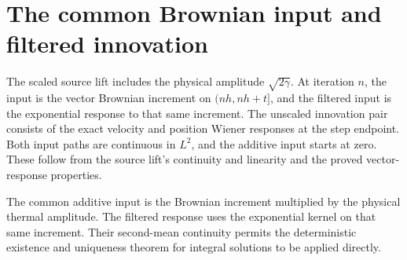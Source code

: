 \documentclass[11pt,a4paper]{article}
\begin{document}
\section{\texorpdfstring{The common Brownian input and filtered innovation}{The common Brownian input and filtered innovation}}


The scaled source lift includes the physical amplitude \(\sqrt{2\gamma}\). At iteration \(n\), the input is the vector Brownian increment on \((nh,nh+t]\), and the filtered input is the exponential response to that same increment. The unscaled innovation pair consists of the exact velocity and position Wiener responses at the step endpoint. Both input paths are continuous in \(L^{2}\), and the additive input starts at zero. These follow from the source lift's continuity and linearity and the proved vector-response properties.



The common additive input is the Brownian increment multiplied by the physical thermal amplitude. The filtered response uses the exponential kernel on that same increment. Their second-mean continuity permits the deterministic existence and uniqueness theorem for integral solutions to be applied directly.
\end{document}

